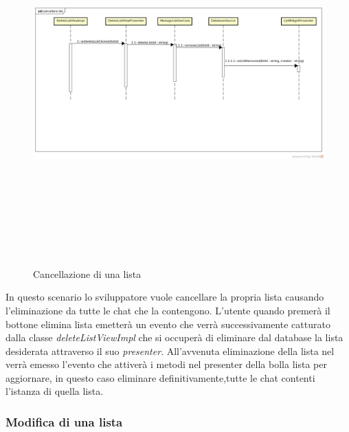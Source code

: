\label{Cancellazione di una lista}
\begin{figure}[ht]
	\centering
	\includegraphics[width=16cm, height=14cm, angle=90]{Sezioni/Diagrammi/img_app/cancellare_lista.jpg}
	\caption{Cancellazione di una lista}
\end{figure}

In questo scenario lo sviluppatore vuole cancellare la propria lista causando l'eliminazione da tutte le chat che la contengono. L'utente quando premerà il bottone elimina lista emetterà un evento che verrà successivamente catturato dalla classe \textit{deleteListViewImpl} che si occuperà di eliminare dal database la lista desiderata attraverso il suo \textit{presenter}. All'avvenuta eliminazione della lista nel  verrà emesso l'evento che attiverà i metodi nel presenter della bolla lista per aggiornare, in questo caso eliminare definitivamente,tutte le chat contenti l'istanza di quella lista. 

\subsubsection{Modifica di una lista}

